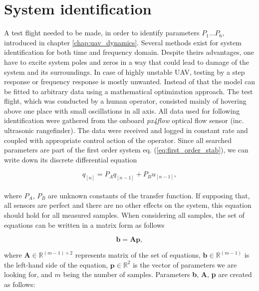\section{System identification}
\label{cap:system_identification}

A test flight needed to be made, in order to identify parameters $P_1 \hdots P_6$, introduced in chapter \ref{chap:uav_dynamics}. Several methods exist for system identification for both time and frequency domain. Despite theirs advantages, one have to excite system poles and zeros in a way that could lead to damage of the system and its surroundings. In case of highly unstable UAV, testing by a step response or frequency response is mostly unwanted. Instead of that the model can be fitted to arbitrary data using a mathematical optimization approach. The test flight, which was conducted by a human operator, consisted mainly of hovering above one place with small oscillations in all axis. All data used for following identification were gathered from the onboard \emph{px4flow} optical flow sensor (inc. ultrasonic rangefinder). The data were received and logged in constant rate and coupled with appropriate control action of the operator. Since all searched parameters are part of the first order system eq. (\ref{eq:first_order_stab}), we can write down its discrete differential equation

\begin{equation}
q_{[n]} = P_Aq_{[n-1]} + P_Bu_{[n-1]},
\end{equation}
\\
where $P_A$, $P_B$ are unknown constants of the transfer function. If supposing that, all sensors are perfect and there are no other effects on the system, this equation should hold for all measured samples. When considering all samples, the set of equations can be written in a matrix form as follows

\begin{equation}
\textbf{b} = \textbf{A}\textbf{p},
\label{eq:bap}
\end{equation}

where $\textbf{A} \in \mathbb{R}^{(m-1)\times2}$ represents matrix of the set of equations, $\textbf{b} \in \mathbb{R}^{(m-1)}$ is the left-hand side of the equation, $\textbf{p} \in \mathbb{R}^{2}$ is the vector of parameters we are looking for, and $m$ being the number of samples. Parameters \textbf{b}, \textbf{A}, \textbf{p} are created as follows:

